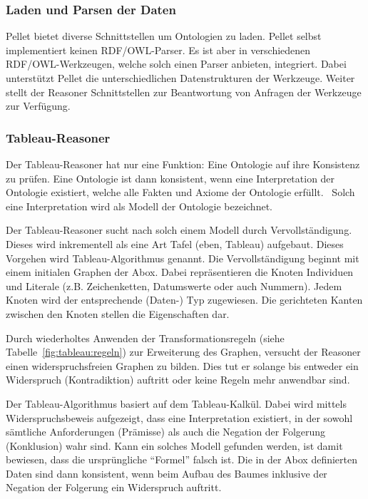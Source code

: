 \subsubsection{Laden und Parsen der Daten}
\label{ssubsection:inferenz_pellet_parsing}
Pellet bietet diverse Schnittstellen um Ontologien zu laden. Pellet selbst implementiert keinen RDF/OWL-Parser. Es ist aber in verschiedenen RDF/OWL-Werkzeugen, welche solch einen Parser anbieten, integriert. Dabei unterstützt Pellet die unterschiedlichen Datenstrukturen der Werkzeuge. Weiter stellt der Reasoner Schnittstellen zur Beantwortung von Anfragen der Werkzeuge zur Verfügung.

\subsubsection{Tableau-Reasoner}
\label{ssubsection:inferenz_pellet_tableaux}
Der Tableau-Reasoner hat nur eine Funktion: Eine Ontologie auf ihre Konsistenz zu prüfen. Eine Ontologie ist dann konsistent, wenn eine Interpretation der Ontologie existiert, welche alle Fakten und Axiome der Ontologie erfüllt.~\cite{w3owlsemantics} Solch eine Interpretation wird als Modell der Ontologie bezeichnet.

Der Tableau-Reasoner sucht nach solch einem Modell durch Vervollständigung. Dieses wird inkrementell als eine Art Tafel (eben, Tableau) aufgebaut. Dieses Vorgehen wird Tableau-Algorithmus genannt. Die Vervollständigung beginnt mit einem initialen Graphen der Abox. Dabei repräsentieren die Knoten Individuen und Literale (z.B. Zeichenketten, Datumswerte oder auch Nummern). Jedem Knoten wird der entsprechende (Daten-) Typ zugewiesen. Die gerichteten Kanten zwischen den Knoten stellen die Eigenschaften dar. %

Durch wiederholtes Anwenden der Transformationsregeln (siehe Tabelle~\ref{fig:tableau:regeln}) zur Erweiterung des Graphen, versucht der Reasoner einen widerspruchsfreien Graphen zu bilden. Dies tut er solange bis entweder ein Widerspruch (Kontradiktion) auftritt oder keine Regeln mehr anwendbar sind.

Der Tableau-Algorithmus basiert auf dem Tableau-Kalkül. Dabei wird mittels Widerspruchsbeweis aufgezeigt, dass eine Interpretation existiert, in der sowohl sämtliche Anforderungen (Prämisse) als auch die Negation der Folgerung (Konklusion) wahr sind. Kann ein solches Modell gefunden werden, ist damit bewiesen, dass die ursprüngliche ``Formel'' falsch ist. Die in der Abox definierten Daten sind dann konsistent, wenn beim Aufbau des Baumes inklusive der Negation der Folgerung ein Widerspruch auftritt.~\cite{baumkalkuel}

